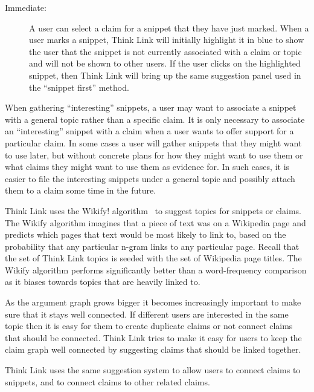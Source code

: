 \documentclass{chi2009}
\newcommand{\todo}[1]{}
\begin{document}
\begin{description}
\item[Immediate:] A user can select a claim for a snippet that they have just marked. When a user marks a snippet, Think Link will initially highlight it in blue to show the user that the snippet is not currently associated with a claim or topic and will not be shown to other users. If the user clicks on the highlighted snippet, then Think Link will bring up the same suggestion panel used in the ``snippet first'' method.
\end{description}

When gathering ``interesting'' snippets, a user may want to associate a snippet with a general topic rather than a specific claim. It is only necessary to associate an ``interesting'' snippet with a claim when a user wants to offer support for a particular claim. In some cases a user will gather snippets that they might want to use later, but without concrete plans for how they might want to use them or what claims they might want to use them as evidence for. In such cases, it is easier to file the interesting snippets under a general topic and possibly attach them to a claim some time in the future.  %

Think Link uses the Wikify! algorithm~\cite{Mihalcea2007} to suggest topics for snippets or claims. The Wikify algorithm imagines that a piece of text was on a Wikipedia page and predicts which pages that text would be most likely to link to, based on the probability that any particular n-gram links to any particular page.  %
Recall that the set of Think Link topics is seeded with the set of Wikipedia page titles. 
The Wikify algorithm performs significantly better than a word-frequency comparison as it biases towards topics that are heavily linked to. %

\todo{Mention about topic previewing}

As the argument graph grows bigger it becomes increasingly important to make sure that it stays well connected. If different users are interested in the same topic then it is easy for them to create duplicate claims or not connect claims that should be connected. Think Link tries to make it easy for users to keep the claim graph well connected by suggesting claims that should be linked together. %

\todo{Allow two claims to be marked as being identical.}

Think Link uses the same suggestion system to allow users to connect claims to snippets, and to connect claims to other related claims. 
\end{document}
